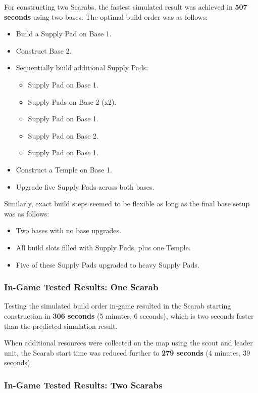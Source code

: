 \documentclass[a4paper, 12pt, english]{article}
\begin{document}
For constructing two Scarabs, the fastest simulated result was achieved in \textbf{507 seconds} using two bases. The optimal build order was as follows:
\begin{itemize}
    \item Build a Supply Pad on Base 1.
    \item Construct Base 2.
    \item Sequentially build additional Supply Pads:
    \begin{itemize}
        \item Supply Pad on Base 1.
        \item Supply Pads on Base 2 (x2).
        \item Supply Pad on Base 1.
        \item Supply Pad on Base 2.
        \item Supply Pad on Base 1.
    \end{itemize}
    \item Construct a Temple on Base 1.
    \item Upgrade five Supply Pads across both bases.
\end{itemize}

Similarly, exact build steps seemed to be flexible as long as the final base setup was as follows:
    \begin{itemize}
        \item Two bases with no base upgrades.
        \item All build slots filled with Supply Pads, plus one Temple.
        \item Five of these Supply Pads upgraded to heavy Supply Pads.
    \end{itemize}

\subsubsection{In-Game Tested Results: One Scarab}

Testing the simulated build order in-game resulted in the Scarab starting construction in \textbf{306 seconds} (5 minutes, 6 seconds), which is two seconds faster than the predicted simulation result.  
\newline

When additional resources were collected on the map using the scout and leader unit, the Scarab start time was reduced further to \textbf{279 seconds} (4 minutes, 39 seconds).

\subsubsection{In-Game Tested Results: Two Scarabs}
\end{document}

